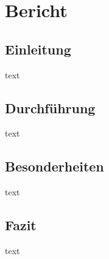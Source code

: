 \section{Bericht}

\subsection{Einleitung}
text

\subsection{Durchführung}\begin{center}
\end{center}
text

\subsection{Besonderheiten}
text

\subsection{Fazit}
text